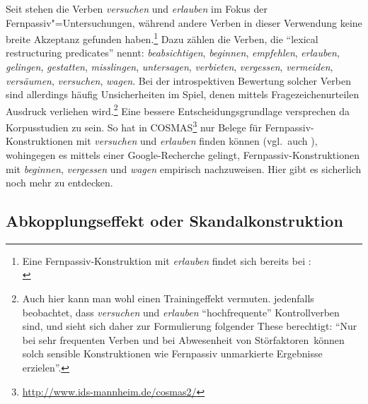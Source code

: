 Seit \cite{Hoehle:78} stehen die Verben {\it versuchen} und {\it erlauben} im Fokus der Fernpassiv"=Untersuchungen, während andere Verben in dieser Verwendung keine breite Akzeptanz gefunden haben.\footnote{Eine Fernpassiv-Konstruktion mit \textit{erlauben} findet sich bereits bei \cite{Bech:55}:\\
} Dazu zählen die Verben, die \citet[16]{Wurmbrand:01} "`lexical restructuring predicates"' nennt: {\it beabsichtigen}, {\it beginnen}, {\it empfehlen}, {\it erlauben}, {\it gelingen}, {\it gestatten}, {\it misslingen}, {\it untersagen}, {\it verbieten}, {\it vergessen}, {\it vermeiden}, {\it versäumen}, {\it versuchen}, {\it wagen}. Bei der introspektiven Bewertung solcher Verben sind allerdings häufig Unsicherheiten im Spiel, denen mittels Fragezeichenurteilen Ausdruck verliehen wird.\footnote{Auch hier kann man wohl einen Trainingeffekt vermuten. \citet[31]{Grosse:05} jedenfalls beobachtet, dass {\it versuchen} und {\it erlauben} "`hochfrequente"' Kontrollverben sind, und sieht sich daher zur Formulierung folgender These berechtigt: "`Nur bei sehr frequenten Verben und bei Abwesenheit von \glq Störfaktoren\grq\ können solch sensible Konstruktionen wie Fernpassiv unmarkierte Ergebnisse erzielen"'.} Eine bessere Entscheidungsgrundlage versprechen da Korpusstudien zu sein. So hat \citet[30f]{Grosse:05} in COSMAS\footnote{\url{http://www.ids-mannheim.de/cosmas2/}} nur Belege für Fernpassiv-Konstruktionen mit {\it versuchen} und {\it erlauben} finden können (vgl.\ auch \citealt[Abschnitt~3.1.4.1]{Mueller:02}), wohingegen es \cite{Wurmbrand:03} mittels einer Google-Recherche gelingt, Fernpassiv-Konstruktionen mit {\it beginnen}, {\it vergessen} und {\it wagen} empirisch nachzuweisen. Hier gibt es sicherlich noch mehr zu entdecken.  
 
\subsection{Abkopplungseffekt oder Skandalkonstruktion} \label{sec-skandal}
  
